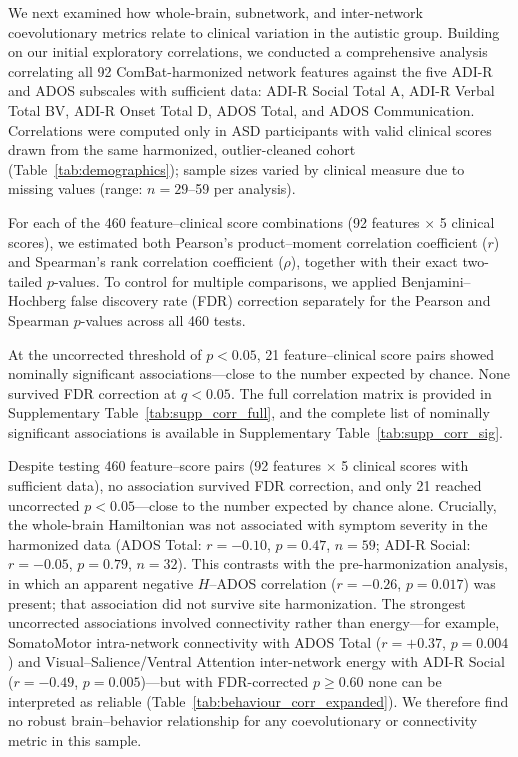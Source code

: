 \documentclass[10pt,letterpaper]{article}
\begin{document}
We next examined how whole-brain, subnetwork, and inter-network coevolutionary metrics relate to
clinical variation in the autistic group. Building on our initial exploratory correlations, we
conducted a comprehensive analysis correlating all 92 ComBat-harmonized network features against the
five ADI-R and ADOS subscales with sufficient data: ADI-R Social Total A, ADI-R Verbal Total BV,
ADI-R Onset Total D, ADOS Total, and ADOS Communication.
Correlations were computed only in ASD participants with valid clinical scores drawn from the same
harmonized, outlier-cleaned cohort (Table~\ref{tab:demographics}); sample sizes varied by clinical
measure due to missing values (range: $n = 29$--59 per analysis).

For each of the 460 feature--clinical score combinations (92 features $\times$ 5 clinical scores),
we estimated both Pearson's product--moment correlation coefficient ($r$) and Spearman's rank
correlation coefficient ($\rho$), together with their exact two-tailed $p$-values. To control for
multiple comparisons, we applied Benjamini--Hochberg false discovery rate (FDR) correction
separately for the Pearson and Spearman $p$-values across all 460 tests.

At the uncorrected threshold of $p < 0.05$, 21 feature--clinical score pairs showed nominally
significant associations---close to the number expected by chance. None survived FDR correction at
$q < 0.05$.
The full correlation matrix is provided in Supplementary Table~\ref{tab:supp_corr_full}, and the
complete list of nominally significant associations is available in Supplementary
Table~\ref{tab:supp_corr_sig}.

Despite testing 460 feature--score pairs (92 features $\times$ 5 clinical scores with sufficient
data), no association survived FDR correction, and only 21 reached uncorrected $p < 0.05$---close to
the number expected by chance alone. Crucially, the whole-brain Hamiltonian was not associated with
symptom severity in the harmonized data (ADOS Total: $r = -0.10$, $p = 0.47$, $n = 59$; ADI-R Social:
$r = -0.05$, $p = 0.79$, $n = 32$). This contrasts with the pre-harmonization analysis, in which an
apparent negative $H$--ADOS correlation ($r = -0.26$, $p = 0.017$) was present; that association did
not survive site harmonization. The strongest uncorrected associations involved connectivity rather
than energy---for example, SomatoMotor intra-network connectivity with ADOS Total ($r = +0.37$,
$p = 0.004$) and Visual--Salience/Ventral Attention inter-network energy with ADI-R Social
($r = -0.49$, $p = 0.005$)---but with FDR-corrected $p \geq 0.60$ none can be interpreted as reliable
(Table~\ref{tab:behaviour_corr_expanded}). We therefore find no robust brain--behavior relationship
for any coevolutionary or connectivity metric in this sample.
\end{document}
